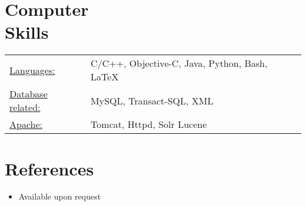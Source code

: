 \documentclass[margin]{res}
\begin{document}
\begin{resume}
\section{Computer \\ Skills}
\begin{tabular}{l p{3in}}
\underline{Languages:} & C/C++, Objective-C, Java, Python, Bash, LaTeX \\
\underline{Database related:} & MySQL, Transact-SQL, XML \\
\underline{Apache:} & Tomcat, Httpd, Solr Lucene
\end{tabular}

\section{References}
\begin{itemize} \itemsep -2pt
\item Available upon request
\end{itemize}
\end{resume}
\end{document}
